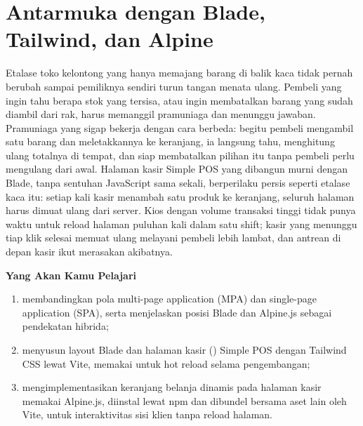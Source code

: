 
\chapter{Antarmuka dengan Blade, Tailwind, dan Alpine}
\label{ch:blade-dan-tailwind}


Etalase toko kelontong yang hanya memajang barang di balik kaca tidak pernah
berubah sampai pemiliknya sendiri turun tangan menata ulang. Pembeli yang
ingin tahu berapa stok yang tersisa, atau ingin membatalkan barang yang
sudah diambil dari rak, harus memanggil pramuniaga dan menunggu jawaban.
Pramuniaga yang sigap bekerja dengan cara berbeda: begitu pembeli mengambil
satu barang dan meletakkannya ke keranjang, ia langsung tahu, menghitung
ulang totalnya di tempat, dan siap membatalkan pilihan itu tanpa pembeli
perlu mengulang dari awal. Halaman kasir Simple POS yang dibangun murni
dengan Blade, tanpa sentuhan JavaScript sama sekali, berperilaku persis
seperti etalase kaca itu: setiap kali kasir menambah satu produk ke
keranjang, seluruh halaman harus dimuat ulang dari server. Kios dengan
volume transaksi tinggi tidak punya waktu untuk reload halaman puluhan
kali dalam satu shift; kasir yang menunggu tiap klik selesai memuat ulang
melayani pembeli lebih lambat, dan antrean di depan kasir ikut merasakan
akibatnya.

\textbf{Yang Akan Kamu Pelajari}

\begin{enumerate}
  \item membandingkan pola multi-page application (MPA) dan single-page application (SPA), serta menjelaskan posisi Blade dan Alpine.js sebagai pendekatan hibrida;
  \item menyusun layout Blade dan halaman kasir () Simple POS dengan Tailwind CSS lewat Vite, memakai  untuk hot reload selama pengembangan;
  \item mengimplementasikan keranjang belanja dinamis pada halaman kasir memakai Alpine.js, diinstal lewat npm dan dibundel bersama aset lain oleh Vite, untuk interaktivitas sisi klien tanpa reload halaman.
\end{enumerate}

